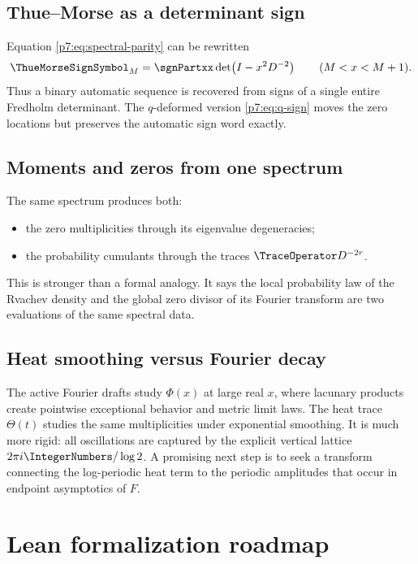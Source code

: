 \documentclass[11pt]{article}
\numberwithin{equation}{section}
\theoremstyle{definition}
\theoremstyle{remark}
\begin{document}
\subsection{Thue--Morse as a determinant sign}

Equation \cref{p7:eq:spectral-parity} can be rewritten
\begin{equation}\label{p7:eq:tm-determinant-sign}
 \ThueMorseSignSymbol_M=\sgnPartxx\det\!\left(I-x^2D^{-2}\right)
 \qquad(M<x<M+1).
\end{equation}
Thus a binary automatic sequence is recovered from signs of a single entire Fredholm determinant.  The $q$-deformed version \cref{p7:eq:q-sign} moves the zero locations but preserves the automatic sign word exactly.

\subsection{Moments and zeros from one spectrum}

The same spectrum produces both:
\begin{itemize}[leftmargin=2em]
\item the zero multiplicities through its eigenvalue degeneracies;
\item the probability cumulants through the traces $\TraceOperator D^{-2r}$.
\end{itemize}
This is stronger than a formal analogy.  It says the local probability law of the Rvachev density and the global zero divisor of its Fourier transform are two evaluations of the same spectral data.

\subsection{Heat smoothing versus Fourier decay}

The active Fourier drafts study $\Phi(x)$ at large real $x$, where lacunary products create pointwise exceptional behavior and metric limit laws.  The heat trace $\Theta(t)$ studies the same multiplicities under exponential smoothing.  It is much more rigid: all oscillations are captured by the explicit vertical lattice $2\pi i\IntegerNumbers/\log2$.  A promising next step is to seek a transform connecting the log-periodic heat term to the periodic amplitudes that occur in endpoint asymptotics of $F$.

\section{Lean formalization roadmap}
\end{document}
